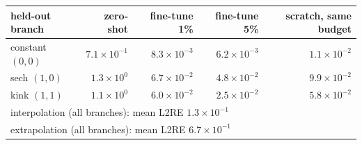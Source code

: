 \begin{tabular}{lrrrr}
\toprule
held-out branch & zero-shot & fine-tune 1\% & fine-tune 5\% & scratch, same budget \\
\midrule
constant $(0,0)$ & $7.1\times10^{-1}$ & $8.3\times10^{-3}$ & $6.2\times10^{-3}$ & $1.1\times10^{-2}$ \\
sech $(1,0)$ & $1.3\times10^{0}$ & $6.7\times10^{-2}$ & $4.8\times10^{-2}$ & $9.9\times10^{-2}$ \\
kink $(1,1)$ & $1.1\times10^{0}$ & $6.0\times10^{-2}$ & $2.5\times10^{-2}$ & $5.8\times10^{-2}$ \\
\multicolumn{5}{l}{interpolation (all branches): mean L2RE $1.3\times10^{-1}$} \\
\multicolumn{5}{l}{extrapolation (all branches): mean L2RE $6.7\times10^{-1}$} \\
\bottomrule
\end{tabular}